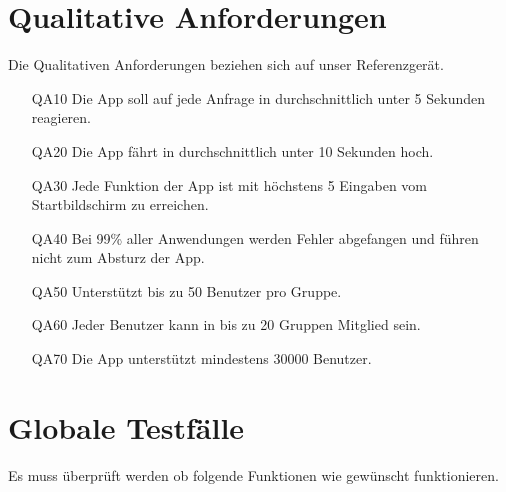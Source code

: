 \documentclass{scrartcl}
\begin{document}
	\section{Qualitative Anforderungen}
	Die Qualitativen Anforderungen beziehen sich auf unser Referenzgerät.
	\begin{itemize}
		\item[QA10] Die App soll auf jede Anfrage in durchschnittlich unter 5 Sekunden reagieren.
		\item[QA20] Die App fährt in durchschnittlich unter 10 Sekunden hoch.
		\item[QA30] Jede Funktion der App ist mit höchstens 5 Eingaben vom Startbildschirm zu erreichen.
		\item[QA40] Bei 99\% aller Anwendungen werden Fehler abgefangen und führen nicht zum Absturz der App.
		\item[QA50] Unterstützt bis zu 50 Benutzer pro Gruppe.
		\item[QA60] Jeder Benutzer kann in bis zu 20 Gruppen \gls{Mitglied} sein.
		\item[QA70] Die App unterstützt mindestens 30000 Benutzer.
	\end{itemize}
	
	\newpage
	
	
	\section{Globale Testfälle}

	Es muss überprüft werden ob folgende Funktionen wie gewünscht funktionieren.
	
\end{document}
